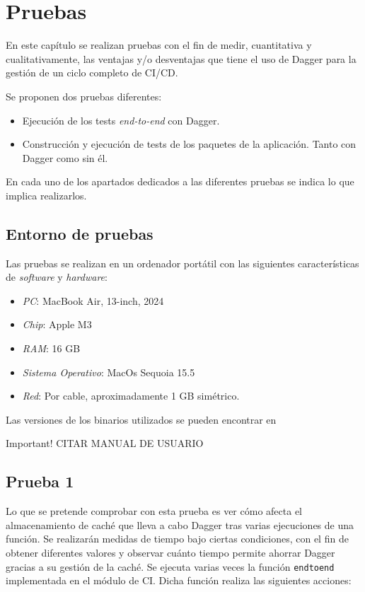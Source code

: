 \chapter{Pruebas}

En este capítulo se realizan pruebas con el fin de medir, cuantitativa y cualitativamente, las ventajas y/o desventajas que tiene el uso de Dagger para la gestión de un ciclo completo de CI/CD.

Se proponen dos pruebas diferentes:

\begin{itemize}
  \item Ejecución de los tests \textit{end-to-end} con Dagger.
  \item Construcción y ejecución de tests de los paquetes de la aplicación. Tanto con Dagger como sin él.
\end{itemize}

En cada uno de los apartados dedicados a las diferentes pruebas se indica lo que implica realizarlos.

\section{Entorno de pruebas}

Las pruebas se realizan en un ordenador portátil con las siguientes características de \textit{software} y \textit{hardware}:

\begin{itemize}
  \item \textit{PC}: MacBook Air, 13-inch, 2024
  \item \textit{Chip}: Apple M3
  \item \textit{RAM}: 16 GB
  \item \textit{Sistema Operativo}: MacOs Sequoia 15.5
  \item \textit{Red}: Por cable, aproximadamente 1 GB simétrico.
\end{itemize}

Las versiones de los binarios utilizados se pueden encontrar en 
\begin{bclogo}[logo=\bcattention]{Important!}
  CITAR MANUAL DE USUARIO
\end{bclogo}


\section{Prueba 1}

Lo que se pretende comprobar con esta prueba es ver cómo afecta el almacenamiento de caché que lleva a cabo Dagger tras varias ejecuciones de una función. Se realizarán medidas de tiempo bajo ciertas condiciones, con el fin de obtener diferentes valores y observar cuánto tiempo permite ahorrar Dagger gracias a su gestión de la caché. Se ejecuta varias veces la función \texttt{endtoend} implementada en el módulo de CI. Dicha función realiza las siguientes acciones:

